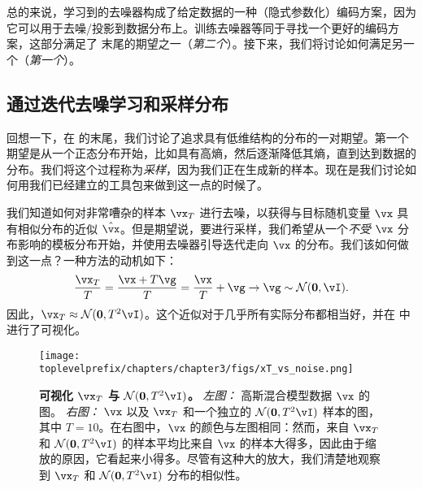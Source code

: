 \documentclass[../../book-main_zh.tex]{subfiles}
\begin{document}
总的来说，学习到的去噪器构成了给定数据的一种（隐式参数化）编码方案，因为它可以用于去噪/投影到数据分布上。训练去噪器等同于寻找一个更好的编码方案，这部分满足了  末尾的期望之一（\textit{第二个}）。接下来，我们将讨论如何满足另一个（\textit{第一个}）。


\subsection{通过迭代去噪学习和采样分布}\label{sub:sampling_denoising}

回想一下，在  的末尾，我们讨论了追求具有低维结构的分布的一对期望。第一个期望是从一个正态分布开始，比如具有高熵，然后逐渐降低其熵，直到达到数据的分布。我们将这个过程称为\textit{采样}，因为我们正在生成新的样本。现在是我们讨论如何用我们已经建立的工具包来做到这一点的时候了。

我们知道如何对非常嘈杂的样本 \(\vx_{T}\) 进行去噪，以获得与目标随机变量 \(\vx\) 具有相似分布的近似 \(\hat{\vx}\)。但是期望说，要进行采样，我们希望从一个\textit{不受} \(\vx\) 分布影响的模板分布开始，并使用去噪器引导迭代走向 \(\vx\) 的分布。我们该如何做到这一点？一种方法的动机如下：
\begin{equation}\label{eq:ve_converge_to_large_gaussian}
	\frac{\vx_{T}}{T} = \frac{\vx + T\vg}{T} = \frac{\vx}{T} + \vg \to \vg \sim \dNorm(\vzero, \vI).
\end{equation}
因此，\(\vx_{T} \approx \dNorm(\vzero, T^{2}\vI)\)。这个近似对于几乎所有实际分布都相当好，并在  中进行了可视化。
\begin{figure}
	\centering 
	\texttt{[image: \\toplevelprefix/chapters/chapter3/figs/xT\_vs\_noise.png]}
	\caption{\small\textbf{可视化 \(\vx_{T}\) 与 \(\dNorm(\vzero, T^{2}\vI)\)。} \textit{左图：} 高斯混合模型数据 \(\vx\) 的图。 \textit{右图：} \(\vx\) 以及 \(\vx_{T}\) 和一个独立的 \(\dNorm(\vzero, T^{2}\vI)\) 样本的图，其中 \(T = 10\)。在右图中，\(\vx\) 的颜色与左图相同：然而，来自 \(\vx_{T}\) 和 \(\dNorm(\vzero, T^{2}\vI)\) 的样本平均比来自 \(\vx\) 的样本大得多，因此由于缩放的原因，它看起来小得多。尽管有这种大的放大，我们清楚地观察到 \(\vx_{T}\) 和 \(\dNorm(\vzero, T^{2}\vI)\) 分布的相似性。}
	\label{fig:xT_vs_noise}
\end{figure}
\end{document}
